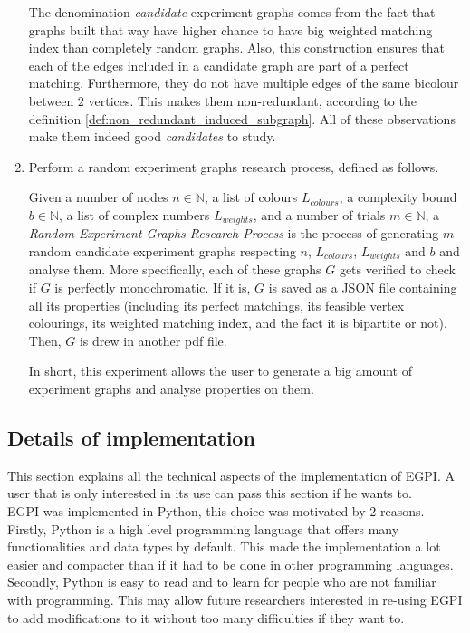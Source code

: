 \begin{enumerate}
    The denomination \textit{candidate} experiment graphs comes from the fact that graphs built that way have higher chance to have big weighted matching index than completely random graphs. Also, this construction ensures that each of the edges included in a candidate graph are part of a perfect matching. Furthermore, they do not have multiple edges of the same bicolour between $2$ vertices. This makes them non-redundant, according to the definition \ref{def:non_redundant_induced_subgraph}. All of these observations make them indeed good \textit{candidates} to study.

    \item Perform a random experiment graphs research process, defined as follows.
    \begin{definition}
        Given a number of nodes $n \in \mathbb{N}$, a list of colours $L_{colours}$, a complexity bound $b \in \mathbb{N}$, a list of complex numbers $L_{weights}$, and a number of trials $m \in \mathbb{N}$, a \textit{Random Experiment Graphs Research Process} is the process of generating $m$ random candidate experiment graphs respecting $n$, $L_{colours}$, $L_{weights}$ and $b$ and analyse them. More specifically, each of these graphs $G$ gets verified to check if $G$ is perfectly monochromatic. If it is, $G$ is saved as a JSON file containing all its properties (including its perfect matchings, its feasible vertex colourings, its weighted matching index, and the fact it is bipartite or not). Then, $G$ is drew in another pdf file.
    \end{definition}

    In short, this experiment allows the user to generate a big amount of experiment graphs and analyse properties on them.
\end{enumerate}

\subsection{Details of implementation}
\label{subsec:details-of-implementation}

This section explains all the technical aspects of the implementation of EGPI. A user that is only interested in its use can pass this section if he wants to.\\

EGPI was implemented in Python, this choice was motivated by 2 reasons. Firstly, Python is a high level programming language that offers many functionalities and data types by default.\cite{python} This made the implementation a lot easier and compacter than if it had to be done in other programming languages. Secondly, Python is easy to read and to learn for people who are not familiar with programming. This may allow future researchers interested in re-using EGPI to add modifications to it without too many difficulties if they want to.\\

